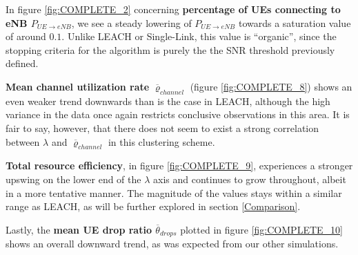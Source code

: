 In figure \ref{fig:COMPLETE_2} concerning \textbf{percentage of UEs connecting to eNB $P_{UE\rightarrow eNB}$}, we see a steady lowering of $P_{UE\rightarrow eNB}$ towards a saturation value of around $0.1$. Unlike LEACH or Single-Link, this value is ``organic'', since the stopping criteria for the algorithm is purely the the SNR threshold previously defined. 

\textbf{Mean channel utilization rate} $\overline{\varrho}_{channel}$ (figure \ref{fig:COMPLETE_8}) shows an even weaker trend downwards than is the case in LEACH, although the high variance in the data once again restricts conclusive observations in this area. It is fair to say, however, that there does not seem to exist a strong correlation between $\lambda$ and $\overline{\varrho}_{channel}$ in this clustering scheme.

\textbf{Total resource efficiency}, in figure \ref{fig:COMPLETE_9}, experiences a stronger upswing on the lower end of the $\lambda$ axis and continues to grow throughout, albeit in a more tentative manner. The magnitude of the values stays within a similar range as LEACH, as will be further explored in section \ref{Comparison}.

Lastly, the \textbf{mean UE drop ratio $\overline{\theta}_{drops}$} plotted in figure \ref{fig:COMPLETE_10} shows an overall downward trend, as was expected from our other simulations.

